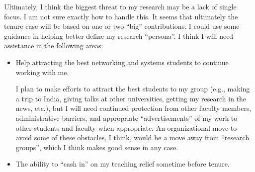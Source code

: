 \begin{sloppypar}
Ultimately, I think the biggest threat to my research may be a lack of
single focus.  I am not sure exactly how to handle this.  It seems that
ultimately the tenure case will be based on one or two ``big''
contributions.  I could use some guidance in helping better define my
research ``persona''.  I think I will need assistance in the following
areas:
\begin{itemize}
\itemsep=-1pt
\item Help attracting the best networking and systems students to
  continue working with me.

  I plan to make efforts to attract the best students to my group (e.g.,
  making a trip to India, giving talks at other universities, getting my
  research in the news, etc.), but I will need continued protection from
  other faculty members, administrative barriers, and appropriate
  ``advertisements'' of my work to other students and faculty when
  appropriate.  An organizational move to avoid some of these obstacles,
  I think, would be a move away from ``research groups'', which I think
  makes good sense in any case.

\item The ability to ``cash in'' on my teaching relief sometime before
  tenure.
\end{itemize}

\end{sloppypar}
